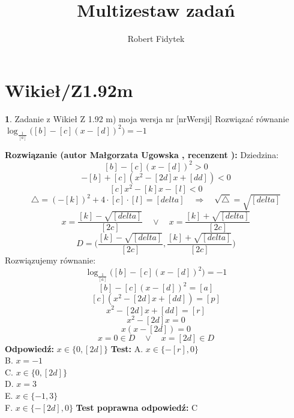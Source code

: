 \documentclass[12pt, a4paper]{article}
\title{Multizestaw zadań}
\author{Robert Fidytek}
\date{}
\theoremstyle{definition} %
\newtheorem{zad}{}
\newcommand{\kategoria}[1]{\section{#1}} %
\newcommand{\zadStart}[1]{\begin{zad}#1\newline} %
\newcommand{\zadStop}{\end{zad}}   %
\newcommand{\rozwStart}[2]{\noindent \textbf{Rozwiązanie (autor #1 , recenzent #2): }\newline} %
\newcommand{\rozwStop}{\newline}                                            %
\newcommand{\odpStart}{\noindent \textbf{Odpowiedź:}\newline}    %
\newcommand{\odpStop}{\newline}                                             %
\newcommand{\testStart}{\noindent \textbf{Test:}\newline} %
\newcommand{\testStop}{\newline} %
\newcommand{\kluczStart}{\noindent \textbf{Test poprawna odpowiedź:}\newline} %
\newcommand{\kluczStop}{\newline} %
\begin{document}
\maketitle


\kategoria{Wikieł/Z1.92m}
\zadStart{Zadanie z Wikieł Z 1.92 m) moja wersja nr [nrWersji]}
Rozwiązać równanie $ \log_{\frac{1}{[a]}}{\big([b]- [c] (x-[d])^2\big)} = -1$
\zadStop
\rozwStart{Małgorzata Ugowska}{}
Dziedzina:
$$[b]- [c] (x-[d])^2>0$$
$$ -[b]+[c] (x^2-[2d]x+[dd])<0$$
$$ [c] x^2-[k]x-[l]<0$$
$$ \bigtriangleup = (-[k])^2 + 4 \cdot [c] \cdot [l] = [delta] \quad  \Longrightarrow \quad \sqrt{\bigtriangleup} = \sqrt{[delta]}$$
$$x =\frac{[k]-\sqrt{[delta]}}{[2c]} \quad \vee \quad x =\frac{[k]+\sqrt{[delta]}}{[2c]}$$
$$D=\Big(\frac{[k]-\sqrt{[delta]}}{[2c]}, \frac{[k]+\sqrt{[delta]}}{[2c]}\Big)$$
Rozwiązujemy równanie:
$$\log_{\frac{1}{[a]}}{\big([b]- [c] (x-[d])^2\big)} = -1$$
$$ [b]- [c] (x-[d])^2= [a]$$
$$ [c] (x^2-[2d]x+[dd])= [p]$$
$$ x^2-[2d]x+[dd]= [r]$$
$$x^2-[2d]x=0$$
$$x(x-[2d])=0$$
$$x=0 \in D \quad \vee \quad x=[2d] \in D$$
\rozwStop
\odpStart
$x \in \{0, [2d] \}$
\odpStop
\testStart
A. $x \in \{-[r], 0 \}$\\
B. $x = -1$\\
C. $x \in \{0, [2d] \}$\\
D. $x = 3$\\
E. $x \in \{-1, 3\}$\\
F. $x \in \{-[2d], 0 \}$
\testStop
\kluczStart
C
\kluczStop
\end{document}
